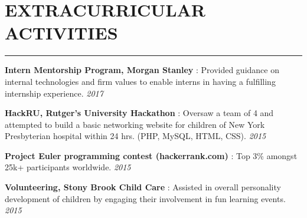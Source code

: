 \documentclass[12pt]{article}
\newcommand{\sectionHeading}[1]{
\vspace{-15pt}
\section*{\small{#1}}
\vspace{-10pt}
\hrule
\vspace{8pt}
}
\newcommand {\projectSectionSubheading}[4]{
    \noindent \small{\textbf{#1} \textit{(#2)} : #3  \hfill \textit{#4}} \\
    \vspace{-10pt}
}
\newcommand {\extracurricularSectionSubheading}[3]{
    \noindent \small{\textbf{#1} : #2 \hfill \textit{#3}} \\
    \vspace{-10pt}
}
\newcommand{\sectionListStart}{
    \begin{itemize}[label={\small{\textbullet}}, leftmargin=20pt] %
}
\newcommand{\sectionListEnd}{\end{itemize} \vspace{0pt}}
\newcommand{\sectionListItem}[1]{\item \small{#1}}
\begin{document}



\sectionHeading{EXTRACURRICULAR ACTIVITIES}


\extracurricularSectionSubheading{Intern Mentorship Program, Morgan Stanley}{Provided guidance on internal technologies and firm values to enable interns in having a fulfilling internship experience.}{2017}

\extracurricularSectionSubheading{HackRU, Rutger's University Hackathon}{Oversaw a team of 4 and attempted to build a basic networking website for children of New York Presbyterian hospital within 24 hrs. (PHP, MySQL, HTML, CSS).}{2015}

\extracurricularSectionSubheading{Project Euler programming contest (hackerrank.com)}{Top 3\% amongst 25k+ participants worldwide.}{2015}

\extracurricularSectionSubheading{Volunteering, Stony Brook Child Care}{Assisted in overall personality development of children by engaging their involvement in fun learning events.}{2015}
\end{document}
